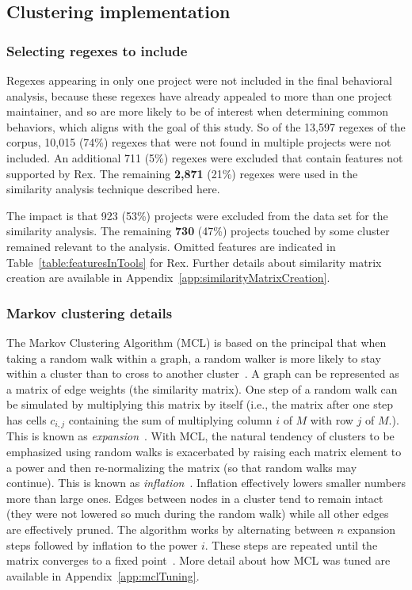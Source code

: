 \subsection{Clustering implementation}

\subsubsection{Selecting regexes to include}
Regexes appearing in only one project were not included in the final behavioral analysis, because these regexes have already appealed to more than one project maintainer, and so are more likely to be of interest when determining common behaviors, which aligns with the goal of this study.  So of the 13,597 regexes of the corpus, 10,015 (74\%) regexes that were not found in multiple projects were not included.
An additional 711 (5\%) regexes were excluded that contain features not supported by Rex.  The remaining \textbf{2,871} (21\%) regexes were used in the similarity analysis technique described here.

The impact is that 923 (53\%) projects were excluded from the data set for the similarity analysis.  The remaining \textbf{730} (47\%) projects touched by some cluster remained relevant to the analysis. Omitted features are indicated in Table~\ref{table:featuresInTools} for Rex.  Further details about similarity matrix creation are available in Appendix~\ref{app:similarityMatrixCreation}.

\subsubsection{Markov clustering details}
The Markov Clustering Algorithm (MCL) is based on the principal that when taking a random walk within a graph, a random walker is more likely to stay within a cluster than to cross to another cluster~.  A graph can be represented as a matrix of edge weights (the similarity matrix).  One step of a random walk can be simulated by multiplying this matrix by itself (i.e., the matrix after one step has cells $c_{i,j}$ containing the sum of multiplying column $i$ of $M$ with row $j$ of $M$.).  This is known as \emph{expansion}~.  With MCL, the natural tendency of clusters to be emphasized using random walks is exacerbated by raising each matrix element to a power and then re-normalizing the matrix (so that random walks may continue).  This is known as \emph{inflation}~.  Inflation effectively lowers smaller numbers more than large ones.  Edges between nodes in a cluster tend to remain intact (they were not lowered so much during the random walk) while all other edges are effectively pruned.  The algorithm works by alternating between $n$ expansion steps followed by inflation to the power $i$.  These steps are repeated until the matrix converges to a fixed point~.  More detail about how MCL was tuned are available in Appendix~\ref{app:mclTuning}.
